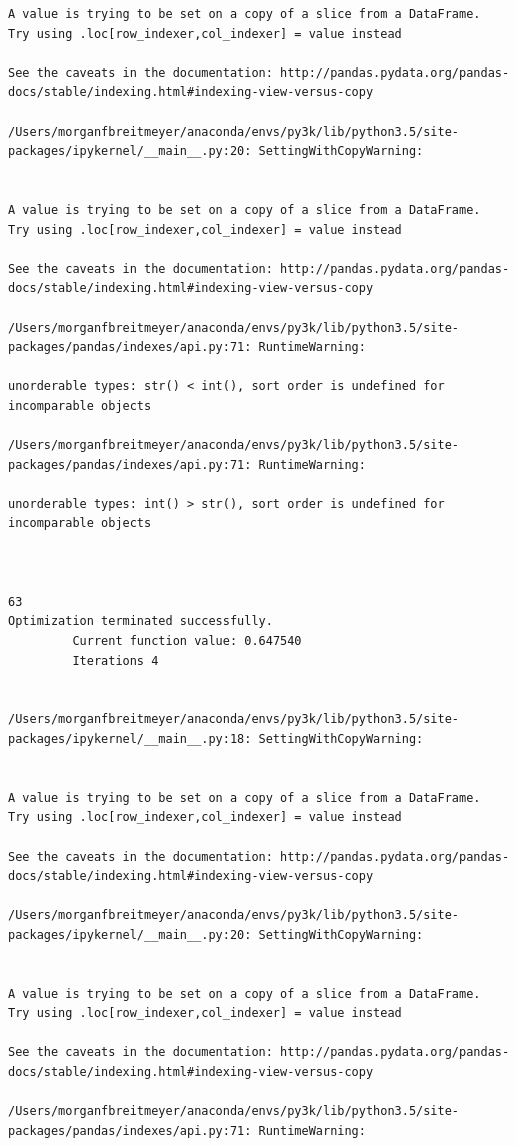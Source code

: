\begin{lstlisting}
A value is trying to be set on a copy of a slice from a DataFrame.
Try using .loc[row_indexer,col_indexer] = value instead

See the caveats in the documentation: http://pandas.pydata.org/pandas-docs/stable/indexing.html#indexing-view-versus-copy

/Users/morganfbreitmeyer/anaconda/envs/py3k/lib/python3.5/site-packages/ipykernel/__main__.py:20: SettingWithCopyWarning:


A value is trying to be set on a copy of a slice from a DataFrame.
Try using .loc[row_indexer,col_indexer] = value instead

See the caveats in the documentation: http://pandas.pydata.org/pandas-docs/stable/indexing.html#indexing-view-versus-copy

/Users/morganfbreitmeyer/anaconda/envs/py3k/lib/python3.5/site-packages/pandas/indexes/api.py:71: RuntimeWarning:

unorderable types: str() < int(), sort order is undefined for incomparable objects

/Users/morganfbreitmeyer/anaconda/envs/py3k/lib/python3.5/site-packages/pandas/indexes/api.py:71: RuntimeWarning:

unorderable types: int() > str(), sort order is undefined for incomparable objects



63
Optimization terminated successfully.
         Current function value: 0.647540
         Iterations 4


/Users/morganfbreitmeyer/anaconda/envs/py3k/lib/python3.5/site-packages/ipykernel/__main__.py:18: SettingWithCopyWarning:


A value is trying to be set on a copy of a slice from a DataFrame.
Try using .loc[row_indexer,col_indexer] = value instead

See the caveats in the documentation: http://pandas.pydata.org/pandas-docs/stable/indexing.html#indexing-view-versus-copy

/Users/morganfbreitmeyer/anaconda/envs/py3k/lib/python3.5/site-packages/ipykernel/__main__.py:20: SettingWithCopyWarning:


A value is trying to be set on a copy of a slice from a DataFrame.
Try using .loc[row_indexer,col_indexer] = value instead

See the caveats in the documentation: http://pandas.pydata.org/pandas-docs/stable/indexing.html#indexing-view-versus-copy

/Users/morganfbreitmeyer/anaconda/envs/py3k/lib/python3.5/site-packages/pandas/indexes/api.py:71: RuntimeWarning:


\end{lstlisting}
